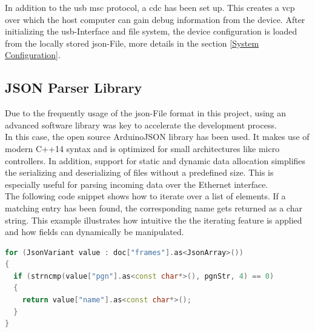 In addition to the \acrshort{usb} \acrshort{msc} protocol, a \acrfull{cdc} has been set up. This creates a \acrfull{vcp} over which the host computer can gain debug information from the device. \newline
After initializing the \acrshort{usb}-Interface and file system, the device configuration is loaded from the locally stored \acrshort{json}-File, more details in the section \ref{System Configuration}.

\subsection{JSON Parser Library} \label{JSON Parser Library}
Due to the frequently usage of the \acrshort{json}-File format in this project, using an advanced software library was key to accelerate the development process. \\
In this case, the open source ArduinoJSON library has been used. It makes use of modern C++14 syntax and is optimized for small architectures like micro controllers. In addition, support for static and dynamic data allocation simplifies the serializing and deserializing of files without a predefined size. This is especially useful for parsing incoming data over the Ethernet interface. \\[0.5em]
The following code snippet shows how to iterate over a list of elements. If a matching entry has been found, the corresponding name gets returned as a char string. This example illustrates how intuitive the the iterating feature is applied and how fields can dynamically be manipulated.

\bigskip
{}
\begin{lstlisting}[backgroundcolor=\color{gray!10},  
                   basicstyle=\ttfamily,
                   columns=fullflexible,
                   breakatwhitespace=false,      
                   breaklines=true,                
                   captionpos=b,                    
                   commentstyle=\color{mygreen}, 
                   extendedchars=true,              
                   frame=single,                   
                   keepspaces=true,             
                   keywordstyle=\color{blue},      
                   language=c++,                 
                   numbers=none,                
                   numbersep=5pt,                   
                   numberstyle=\tiny\color{blue}, 
                   rulecolor=\color{mygray},        
                   showspaces=false,
                   showstringspaces=false,
                   showtabs=false,                 
                   stepnumber=5,                  
                   stringstyle=\color{mymauve},    
                   tabsize=2,                      
                   title=\lstname,
                   frame=none,
                   xleftmargin = 1cm,
                   framexleftmargin = 1em]
for (JsonVariant value : doc["frames"].as<JsonArray>())
{
  if (strncmp(value["pgn"].as<const char*>(), pgnStr, 4) == 0)
  {
    return value["name"].as<const char*>();
  }
}
\end{lstlisting}


